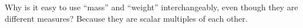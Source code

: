 {Why is it easy to use ``mass'' and ``weight'' interchangeably, even though they are different measures?
}
{Because they are scalar multiples of each other.
}